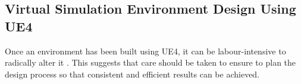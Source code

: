 


\subsection{Virtual Simulation Environment Design Using UE4}
Once an environment has been built using UE4, it can be labour-intensive to radically alter it \cite[p.~454]{Rouse2004GamePractice}. This suggests that care should be taken to ensure to plan the design process so that consistent and efficient results can be achieved.

